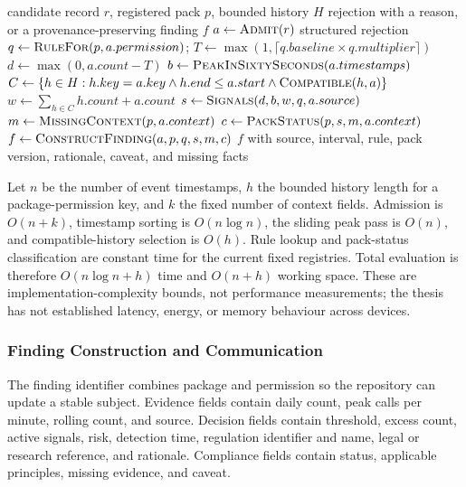 \begin{algorithm}[H]
\caption{Evidence-bounded evaluation of one candidate record}
\label{alg:evidence-bounded-evaluation}
\begin{algorithmic}[1]
\Require candidate record $r$, registered pack $p$, bounded history $H$
\Ensure rejection with a reason, or a provenance-preserving finding $f$
\State $a \gets \Call{Admit}{r}$ 
 \State \Return structured rejection \EndIf
\State $q \gets \Call{RuleFor}{p,a.permission}$; $T \gets \max(1,\lceil q.baseline\times q.multiplier\rceil)$
\State $d \gets \max(0,a.count-T)$
\State $b \gets \Call{PeakInSixtySeconds}{a.timestamps}$
\State $C \gets \{h\in H: h.key=a.key \land h.end\leq a.start \land \Call{Compatible}{h,a}\}$
\State $w \gets \sum_{h\in C}h.count+a.count$
\State $s \gets \Call{Signals}{d,b,w,q,a.source}$
\State $m \gets \Call{MissingContext}{p,a.context}$
\State $c \gets \Call{PackStatus}{p,s,m,a.context}$
\State $f \gets \Call{ConstructFinding}{a,p,q,s,m,c}$
\State \Return $f$ with source, interval, rule, pack version, rationale, caveat, and missing facts
\end{algorithmic}
\end{algorithm}

Let $n$ be the number of event timestamps, $h$ the bounded history length for a package-permission key, and $k$ the fixed number of context fields. Admission is $O(n+k)$, timestamp sorting is $O(n\log n)$, the sliding peak pass is $O(n)$, and compatible-history selection is $O(h)$. Rule lookup and pack-status classification are constant time for the current fixed registries. Total evaluation is therefore $O(n\log n+h)$ time and $O(n+h)$ working space. These are implementation-complexity bounds, not performance measurements; the thesis has not established latency, energy, or memory behaviour across devices.

\subsubsection{Finding Construction and Communication}

The finding identifier combines package and permission so the repository can update a stable subject. Evidence fields contain daily count, peak calls per minute, rolling count, and source. Decision fields contain threshold, excess count, active signals, risk, detection time, regulation identifier and name, legal or research reference, and rationale. Compliance fields contain status, applicable principles, missing evidence, and caveat.

